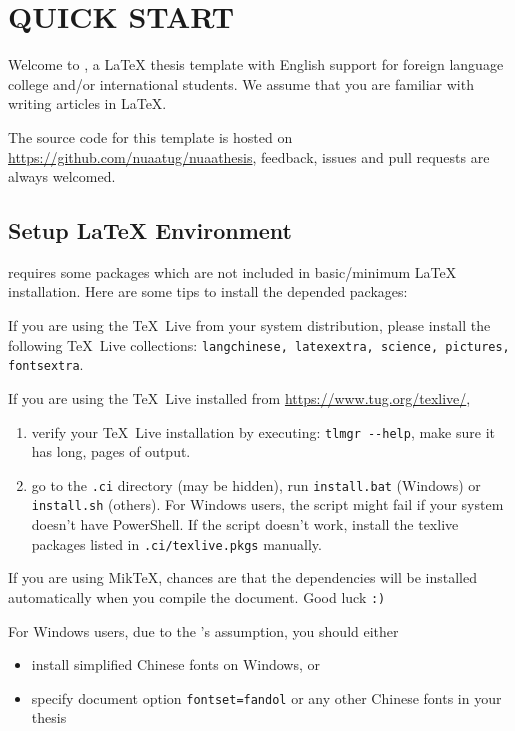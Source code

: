 
\chapter{QUICK START}

Welcome to \nuaathesis,
a \LaTeX{} thesis template with English support for foreign language college and/or international students.
We assume that you are familiar with writing articles in \LaTeX.

The source code for this template is hosted on \url{https://github.com/nuaatug/nuaathesis},
feedback, issues and pull requests are always welcomed.

\section{Setup \LaTeX{} Environment}

\nuaathesis{} requires some packages which are not included in basic/minimum \LaTeX{} installation.
Here are some tips to install the depended packages:

If you are using the \TeX~Live from your system distribution,
please install the following \TeX~Live collections:
\verb|langchinese, latexextra, science, pictures, fontsextra|.

If you are using the \TeX~Live installed from \url{https://www.tug.org/texlive/},
\begin{enumerate}
  \item verify your \TeX~Live installation by executing: \verb|tlmgr --help|,
  make sure it has long, pages of output.
  \item go to the \verb|.ci| directory (may be hidden),
  run \verb|install.bat| (Windows) or \verb|install.sh| (others).
  For Windows users, the script might fail if your system doesn't have PowerShell.
  If the script doesn't work, install the texlive packages listed in \verb|.ci/texlive.pkgs| manually.
\end{enumerate}

If you are using Mik\TeX,
chances are that the dependencies will be installed automatically when you compile the document.
Good luck \verb|:)|

For Windows users, due to the \CTeX's assumption, you should either
\begin{itemize}
  \item install simplified Chinese fonts on Windows, or
  \item specify document option \verb|fontset=fandol| or any other Chinese fonts in your thesis
\end{itemize}

